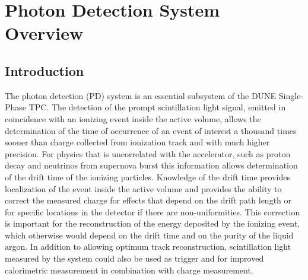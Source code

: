 \section{Photon Detection System Overview}
\label{sec:fdsp-pd-ov}

\subsection{Introduction}
\label{sec:fdsp-pd-intro}

The photon detection (PD) system is an essential subsystem of the DUNE Single-Phase TPC. The detection of the prompt scintillation light signal, emitted in coincidence with an ionizing event inside the active volume, allows the determination of the time of occurrence of an event of interest a thousand times sooner than charge collected from ionization track and with much higher precision. For physics that is uncorrelated with the accelerator, such as proton decay and neutrinos from supernova burst  this information allows determination of the drift time of the ionizing particles.
Knowledge of the drift time provides localization of the event inside the active volume and provides the ability to correct the measured charge for  effects that depend on the drift path length or for specific locations in the detector if there are non-uniformities.  This correction is important for the reconstruction of the energy deposited by the ionizing event, which otherwise would depend on the drift time and on the purity of the liquid argon. In addition to allowing optimum track reconstruction, scintillation light measured by the system could also be used as trigger and for improved calorimetric measurement in combination with charge measurement.

